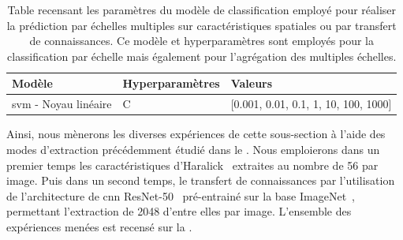 \begin{table}[H]
    \centering
    \begin{tabular}{lll}
        \toprule
        \textbf{Modèle}                                 & \textbf{Hyperparamètres}  & \textbf{Valeurs}                          \\ \midrule
        \gls{svm} - Noyau linéaire                      & C                         & [0.001, 0.01, 0.1, 1, 10, 100, 1000]      \\ 
        \bottomrule 
    \end{tabular} 
    \caption{Table recensant les paramètres du modèle de classification employé pour réaliser la prédiction par échelles multiples sur caractéristiques spatiales ou par transfert de connaissances. Ce modèle et hyperparamètres sont employés pour la classification par échelle mais également pour l'agrégation des multiples échelles.}
    \label{tab:parameters_image_improvement_models_multiscale_spatial}
\end{table}\par

Ainsi, nous mènerons les diverses expériences de cette sous-section à l'aide des modes d'extraction précédemment étudié dans le . Nous emploierons dans un premier temps les caractéristiques d'Haralick~\cite{Haralick1973} extraites au nombre de 56 par image. Puis dans un second temps, le transfert de connaissances par l'utilisation de l'architecture de \gls{cnn} ResNet-50~\cite{He2016} pré-entrainé sur la base ImageNet~\cite{Canziani2016}, permettant l'extraction de 2048 d'entre elles par image. L'ensemble des expériences menées est recensé sur la .\par

